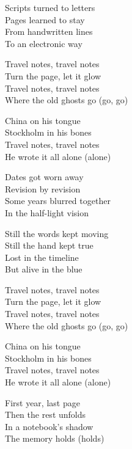 \begin{lyrics}
Scripts turned to letters\\
Pages learned to stay\\
From handwritten lines\\
To an electronic way

Travel notes, travel notes\\
Turn the page, let it glow\\
Travel notes, travel notes\\
Where the old ghosts go (go, go)

China on his tongue\\
Stockholm in his bones\\
Travel notes, travel notes\\
He wrote it all alone (alone)

Dates got worn away\\
Revision by revision\\
Some years blurred together\\
In the half-light vision

Still the words kept moving\\
Still the hand kept true\\
Lost in the timeline\\
But alive in the blue

Travel notes, travel notes\\
Turn the page, let it glow\\
Travel notes, travel notes\\
Where the old ghosts go (go, go)

China on his tongue\\
Stockholm in his bones\\
Travel notes, travel notes\\
He wrote it all alone (alone)

First year, last page\\
Then the rest unfolds\\
In a notebook’s shadow\\
The memory holds (holds)

\end{lyrics}


